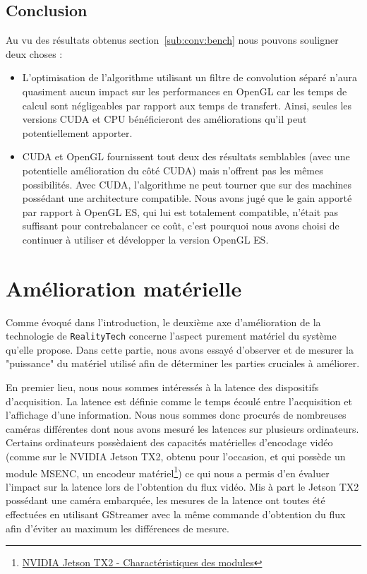 \subsection{Conclusion}
Au vu des résultats obtenus section~\ref{sub:conv:bench} nous pouvons souligner deux choses :
\begin{itemize}
\item L'optimisation de l'algorithme utilisant un filtre de convolution séparé n'aura quasiment aucun impact sur les performances en OpenGL car les temps de calcul sont négligeables par rapport aux temps de transfert. Ainsi, seules les versions CUDA et CPU bénéficieront des améliorations qu'il peut potentiellement apporter.
\item CUDA et OpenGL fournissent tout deux des résultats semblables (avec une potentielle amélioration du côté CUDA) mais n'offrent pas les mêmes possibilités. Avec CUDA, l'algorithme ne peut tourner que sur des machines possédant une architecture compatible. Nous avons jugé que le gain apporté par rapport à OpenGL ES, qui lui est totalement compatible, n'était pas suffisant pour contrebalancer ce coût, c'est pourquoi nous avons choisi de continuer à utiliser et développer la version OpenGL ES.
\end{itemize}

\newpage
\section{Amélioration matérielle}
\label{sec:hardwareup}
Comme évoqué dans l'introduction, le deuxième axe d'amélioration de la technologie de \texttt{RealityTech} concerne l'aspect purement matériel du système qu'elle propose. Dans cette partie, nous avons essayé d'observer et de mesurer la "puissance" du matériel utilisé afin de déterminer les parties cruciales à améliorer.

En premier lieu, nous nous sommes intéressés à la latence des dispositifs d'acquisition. La latence est définie comme le temps écoulé entre l'acquisition et l'affichage d'une information. 
Nous nous sommes donc procurés de nombreuses caméras différentes dont nous avons mesuré les latences sur plusieurs ordinateurs. Certains ordinateurs possèdaient des capacités matérielles d'encodage vidéo (comme sur le NVIDIA Jetson TX2, obtenu pour l'occasion, et qui possède un module MSENC, un encodeur matériel\footnote{\href{https://www.nvidia.fr/autonomous-machines/embedded-systems-dev-kits-modules/}{NVIDIA Jetson TX2 - Charactéristiques des modules}}) ce qui nous a permis d'en évaluer l'impact sur la latence lors de l'obtention du flux vidéo. Mis à part le Jetson TX2 possédant une caméra embarquée, les mesures de la latence ont toutes été effectuées en utilisant GStreamer\cite{gstreamer} avec la même commande d'obtention du flux afin d'éviter au maximum les différences de mesure.

